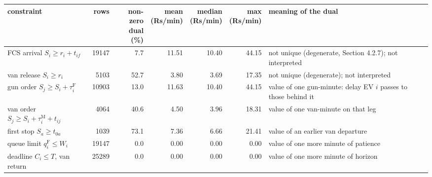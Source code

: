 \begin{tabular}{@{}lrrrrrp{4.6cm}@{}}
\toprule
constraint & rows & \shortstack[r]{non-zero\\dual (\%)} & \shortstack[r]{mean\\(Rs/min)} & \shortstack[r]{median\\(Rs/min)} & \shortstack[r]{max\\(Rs/min)} & meaning of the dual \\
\midrule
FCS arrival $S_i\ge r_i+t_{if}$ & 19147 & 7.7 & 11.51 & 10.40 & 44.15 & not unique (degenerate, Section 4.2.7); not interpreted \\
van release $S_i\ge r_i$ & 5103 & 52.7 & 3.80 & 3.69 & 17.35 & not unique (degenerate); not interpreted \\
gun order $S_j\ge S_i+\tau^{\mathrm F}_i$ & 10903 & 13.0 & 11.63 & 10.40 & 44.15 & value of one gun-minute: delay EV $i$ passes to those behind it \\
van order $S_j\ge S_i+\tau^{\mathrm M}_i+t_{ij}$ & 4064 & 40.6 & 4.50 & 3.96 & 18.31 & value of one van-minute on that leg \\
first stop $S_a\ge t_{0a}$ & 1039 & 73.1 & 7.36 & 6.66 & 21.41 & value of an earlier van departure \\
queue limit $q^{\mathrm F}_i\le W_i$ & 19147 & 0.0 & 0.00 & 0.00 & 0.00 & value of one more minute of patience \\
deadline $C_i\le T$, van return & 25289 & 0.0 & 0.00 & 0.00 & 0.00 & value of one more minute of horizon \\
\bottomrule
\end{tabular}
